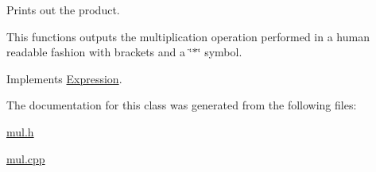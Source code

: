 Prints out the product. 

This functions outputs the multiplication operation performed in a human readable fashion with brackets and a \char`\"{}$\ast$\char`\"{} symbol. 

Implements \hyperlink{class_expression_a6e05f883ebf77faf344dbaebfc82b3a0}{Expression}.



The documentation for this class was generated from the following files\+:\begin{DoxyCompactItemize}
\item 
\hyperlink{mul_8h}{mul.\+h}\item 
\hyperlink{mul_8cpp}{mul.\+cpp}\end{DoxyCompactItemize}

